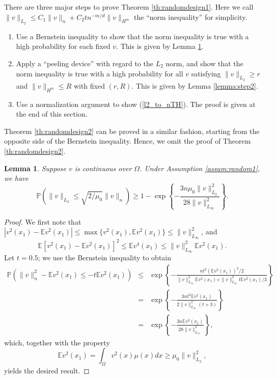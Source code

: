 \documentclass[12pt]{article}
\theoremstyle{plain}
\newtheorem{lemma}{Lemma}
\theoremstyle{remark}
\begin{document}
There are three major steps to prove Theorem \ref{th:randomdesign1}. Here we call $\|v\|_{L_2}\leq C_1\|v\|_{n}+C_2tn^{-m/d}\|v\|_{H^m}$ the ``norm inequality'' for simplicity.
\begin{enumerate}[noitemsep]
    \item Use a Bernstein inequality to show that the norm inequality is true with a high probability for each fixed $v$. This is given by Lemma \ref{lemma:bernstein}.
    \item Apply a ``peeling device'' \citep{geer2000empirical} with regard to the $L_2$ norm, and show that the norm inequality is true with a high probability for all $v$ satisfying $\|v\|_{L_2}\geq r$ and $\|v\|_{H^m}\leq R$ with fixed $(r,R)$. This is given by Lemma \ref{lemma:step2}.
    \item Use a normalization argument to show (\ref{l2_to_nTH}). The proof is given at the end of this section.
\end{enumerate}

Theorem \ref{th:randomdesign2} can be proved in a similar fashion, starting from the opposite side of the Bernstein inequality. Hence, we omit the proof of Theorem \ref{th:randomdesign2}.

\begin{lemma}\label{lemma:bernstein}
    Suppose $v$ is continuous over $\Omega$. Under Assumption \ref{assum:random1}, we have
    \[\mathbb{P}(\|v\|_{L_2}\leq \sqrt{2/\mu_0}\|v\|_n)\geq 1- \exp\left\{-\frac{3n\mu_0\|v\|^2_{L_2}}{28\|v\|^2_{L_\infty}}\right\}.\]
\end{lemma}




\begin{proof}
    We first note that $|v^2(x_1)-\mathbb{E}v^2(x_1)|\leq \max\{v^2(x_1),\mathbb{E}v^2(x_1)\}\leq \|v\|^2_{L_\infty}$, and
    \[\mathbb{E}[v^2(x_1)-\mathbb{E}v^2(x_1)]^2\leq \mathbb{E}v^4(x_1)\leq \|v\|^2_{L_\infty}\mathbb{E}v^2(x_1).\]
    Let $t=0.5$; we use the Bernstein inequality to obtain
    \begin{eqnarray*}
            \mathbb{P}(\|v\|^2_n-\mathbb{E}v^2(x_1)\leq -t\mathbb{E}v^2(x_1))&\leq& \exp\left\{-\frac{nt^2(\mathbb{E}v^2(x_1))^2/2}{\|v\|^2_{L_\infty}\mathbb{E}v^2(x_1)+\|v\|^2_{L_\infty}t\mathbb{E}v^2(x_1)/3}\right\}\nonumber\\
            &=&\exp\left\{-\frac{3nt^2\mathbb{E}v^2(x_1)}{2\|v\|^2_{L_\infty}(t+3)}\right\}\nonumber\\
            &=&\exp\left\{-\frac{3n\mathbb{E}v^2(x_1)}{28\|v\|^2_{L_\infty}}\right\},
    \end{eqnarray*}
    which, together with the property
    \[\mathbb{E}v^2(x_1)=\int_\Omega v^2(x)\mu(x)dx\geq \mu_0\|v\|^2_{L_2},\]
    yields the desired result.
\end{proof}
\end{document}
